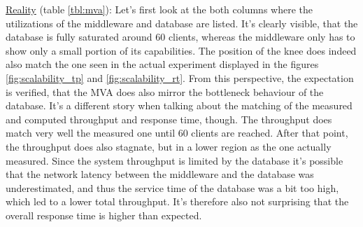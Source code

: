 \documentclass[11pt]{article}
\begin{document}
\underline{Reality} (table \ref{tbl:mva}): Let's first look at the both columns where the utilizations of the middleware and database are listed. It's clearly visible, that the database is fully saturated around 60 clients, whereas the middleware only has to show only a small portion of its capabilities. The position of the knee does indeed also match the one seen in the actual experiment displayed in the figures \ref{fig:scalability_tp} and \ref{fig:scalability_rt}. From this perspective, the expectation is verified, that the MVA does also mirror the bottleneck behaviour of the database. It's a different story when talking about the matching of the measured and computed throughput and response time, though. The throughput does match very well the measured one until 60 clients are reached. After that point, the throughput does also stagnate, but in a lower region as the one actually measured. Since the system throughput is limited by the database it's possible that the network latency between the middleware and the database was underestimated, and thus the service time of the database was a bit too high, which led to a lower total throughput. It's therefore also not surprising that the overall response time is higher than expected.
\end{document}

